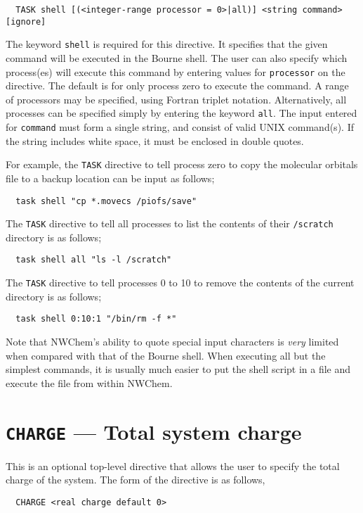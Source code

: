 \begin{verbatim}
  TASK shell [(<integer-range processor = 0>|all)] <string command> [ignore]
\end{verbatim}

The keyword \verb+shell+ is required for this directive.  It specifies
that the given command will be executed in the Bourne shell.  The user
can also specify which process(es) will execute this command by
entering values for \verb+processor+ on the directive.  The default is
for only process zero to execute the command.  A range of processors
may be specified, using Fortran triplet notation.  Alternatively, all
processes can be specified simply by entering the keyword \verb+all+.
The input entered for \verb+command+ must form a single string, and
consist of valid UNIX command(s).  If the string includes white space,
it must be enclosed in double quotes.

For example, the \verb+TASK+ directive to tell process zero to copy the 
molecular orbitals file to a backup location can be input as follows;

\begin{verbatim}
  task shell "cp *.movecs /piofs/save"
\end{verbatim}

The \verb+TASK+ directive to tell all processes to list the contents of 
their \verb+/scratch+ directory is as follows;

\begin{verbatim}
  task shell all "ls -l /scratch"
\end{verbatim}

The \verb+TASK+ directive to tell processes 0 to 10 to remove the 
contents of the current directory is as follows;

\begin{verbatim}
  task shell 0:10:1 "/bin/rm -f *"
\end{verbatim}

Note that NWChem's ability to quote special input characters is {\em
  very} limited when compared with that of the Bourne shell.  When
executing all but the simplest commands, it is usually much easier to
put the shell script in a file and execute the file from within
NWChem.

\section{{\tt CHARGE} --- Total system charge}
\label{sec:charge}

This is an optional top-level directive that allows the user to specify
the total charge of the system.  The form of the directive is as follows,
\begin{verbatim}
  CHARGE <real charge default 0>
\end{verbatim}

